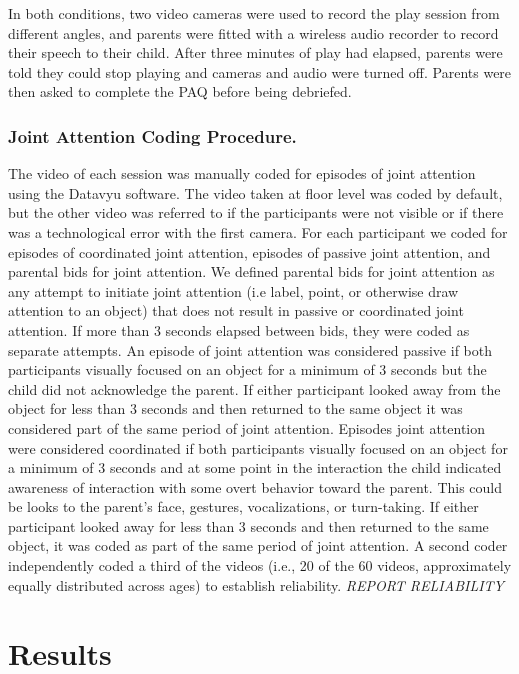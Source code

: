 \documentclass[10pt, letterpaper]{article}
\begin{document}
In both conditions, two video cameras were used to record the play
session from different angles, and parents were fitted with a wireless
audio recorder to record their speech to their child. After three
minutes of play had elapsed, parents were told they could stop playing
and cameras and audio were turned off. Parents were then asked to
complete the PAQ before being debriefed.

\subsubsection{Joint Attention Coding
Procedure.}\label{joint-attention-coding-procedure.}

The video of each session was manually coded for episodes of joint
attention using the Datavyu software. The video taken at floor level was
coded by default, but the other video was referred to if the
participants were not visible or if there was a technological error with
the first camera. For each participant we coded for episodes of
coordinated joint attention, episodes of passive joint attention, and
parental bids for joint attention. We defined parental bids for joint
attention as any attempt to initiate joint attention (i.e label, point,
or otherwise draw attention to an object) that does not result in
passive or coordinated joint attention. If more than 3 seconds elapsed
between bids, they were coded as separate attempts. An episode of joint
attention was considered passive if both participants visually focused
on an object for a minimum of 3 seconds but the child did not
acknowledge the parent. If either participant looked away from the
object for less than 3 seconds and then returned to the same object it
was considered part of the same period of joint attention. Episodes
joint attention were considered coordinated if both participants
visually focused on an object for a minimum of 3 seconds and at some
point in the interaction the child indicated awareness of interaction
with some overt behavior toward the parent. This could be looks to the
parent's face, gestures, vocalizations, or turn-taking. If either
participant looked away for less than 3 seconds and then returned to the
same object, it was coded as part of the same period of joint attention.
A second coder independently coded a third of the videos (i.e., 20 of
the 60 videos, approximately equally distributed across ages) to
establish reliability. \emph{REPORT RELIABILITY}

\section{Results}\label{results}
\end{document}
